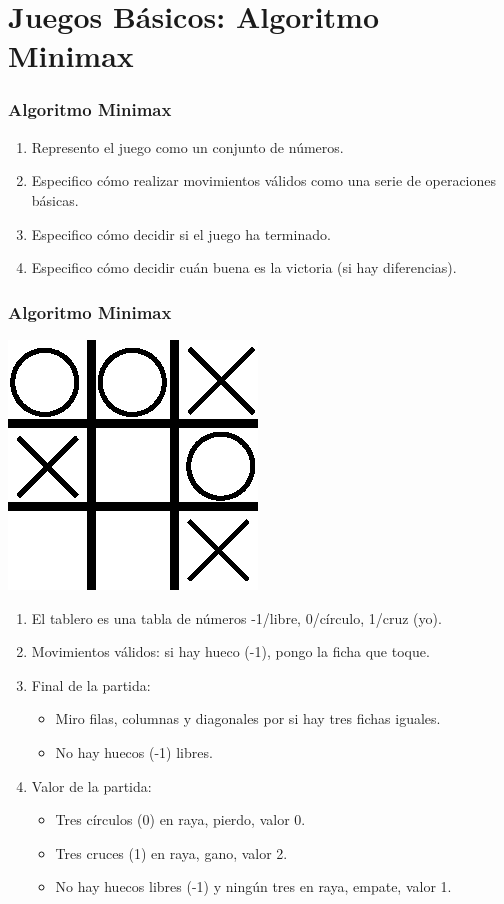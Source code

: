 \documentclass[a4paper,t,xcolor=pst,dvips,colortheme]{beamer}
\begin{document}
\section{Juegos Básicos: Algoritmo Minimax}

\begin{frame}[c]
    \frametitle{Algoritmo Minimax}
    \begin{enumerate}[<+->]
        \item Represento el juego como un conjunto de números.
        \item Especifico cómo realizar movimientos válidos como una serie de operaciones básicas.
        \item Especifico cómo decidir si el juego ha terminado.
        \item Especifico cómo decidir cuán buena es la victoria (si hay diferencias).
    \end{enumerate}
\end{frame}


\begin{frame}[c]
    \frametitle{Algoritmo Minimax}
    \begin{center}
        \includegraphics[width=0.15\linewidth]{images/minimax/tresEnRaya.eps}
    \end{center}
    \begin{enumerate}[<+->]
        \item El tablero es una tabla de números -1/libre, 0/círculo, 1/cruz (yo).
        \item Movimientos válidos: si hay hueco (-1), pongo la ficha que toque.
        \item Final de la partida: 
            \begin{itemize}
                \item Miro filas, columnas y diagonales por si hay tres fichas iguales.
                \item No hay huecos (-1) libres.
            \end{itemize}
        \item Valor de la partida: 
            \begin{itemize}
                \item Tres círculos (0) en raya, pierdo, valor 0. 
                \item Tres cruces (1) en raya, gano, valor 2. 
                \item No hay huecos libres (-1) y ningún tres en raya, empate, valor 1.
            \end{itemize}
    \end{enumerate}
\end{frame}
\end{document}
